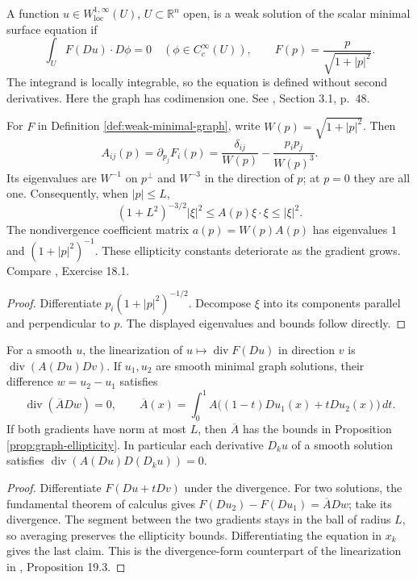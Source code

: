 \begin{definition}\label{def:weak-minimal-graph}
A function $u\in W^{1,\infty}_{\mathrm{loc}}(U)$, $U\subset\mathbb R^n$ open, is a weak solution of the scalar minimal surface equation if
\[
 \int_U F(Du)\cdot D\phi=0\quad(\phi\in C_c^\infty(U)),
 \qquad F(p)=\frac p{\sqrt{1+|p|^2}}.
\]
The integrand is locally integrable, so the equation is defined without second derivatives. Here the graph has codimension one. See \cite{Minter}, Section 3.1, p.~48.
\end{definition}

\begin{proposition}\label{prop:graph-ellipticity}
For $F$ in Definition \ref{def:weak-minimal-graph}, write $W(p)=\sqrt{1+|p|^2}$. Then
\[
 A_{ij}(p)=\partial_{p_j}F_i(p)=\frac{\delta_{ij}}{W(p)}-\frac{p_i p_j}{W(p)^3}.
\]
Its eigenvalues are $W^{-1}$ on $p^\perp$ and $W^{-3}$ in the direction of $p$; at $p=0$ they are all one. Consequently, when $|p|\leq L$,
\[
 (1+L^2)^{-3/2}|\xi|^2\leq A(p)\xi\cdot\xi\leq|\xi|^2.
\]
The nondivergence coefficient matrix $a(p)=W(p)A(p)$ has eigenvalues $1$ and $(1+|p|^2)^{-1}$. These ellipticity constants deteriorate as the gradient grows. Compare \cite{ChMin}, Exercise 18.1.
\end{proposition}
\begin{proof}
Differentiate $p_i(1+|p|^2)^{-1/2}$. Decompose $\xi$ into its components parallel and perpendicular to $p$. The displayed eigenvalues and bounds follow directly.
\end{proof}

\begin{proposition}\label{prop:graph-linearization}
For a smooth $u$, the linearization of $u\mapsto\operatorname{div}F(Du)$ in direction $v$ is $\operatorname{div}(A(Du)Dv)$. If $u_1,u_2$ are smooth minimal graph solutions, their difference $w=u_2-u_1$ satisfies
\[
 \operatorname{div}(\overline A Dw)=0,\qquad
 \overline A(x)=\int_0^1 A\bigl((1-t)Du_1(x)+tDu_2(x)\bigr)\,dt.
\]
If both gradients have norm at most $L$, then $\overline A$ has the bounds in Proposition \ref{prop:graph-ellipticity}. In particular each derivative $D_k u$ of a smooth solution satisfies $\operatorname{div}(A(Du)D(D_k u))=0$.
\end{proposition}
\begin{proof}
Differentiate $F(Du+tDv)$ under the divergence. For two solutions, the fundamental theorem of calculus gives $F(Du_2)-F(Du_1)=\overline A Dw$; take its divergence. The segment between the two gradients stays in the ball of radius $L$, so averaging preserves the ellipticity bounds. Differentiating the equation in $x_k$ gives the last claim. This is the divergence-form counterpart of the linearization in \cite{ChMin}, Proposition 19.3.
\end{proof}

